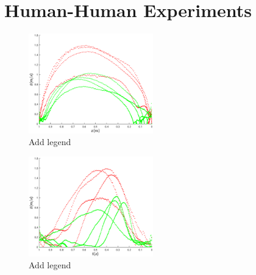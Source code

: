 \section{Human-Human Experiments}
\clearpage


    \begin{figure}[t]
      \centering
      \includegraphics[width = 0.48\textwidth]{Images/vel_distance_plot.eps}
      \caption{Add legend} 
      \label{fig:vel_distance}
	\end{figure}
	
	
    \begin{figure}[t]
      \centering
      \includegraphics[width = 0.48\textwidth]{Images/vel_time_plot.eps}
      \caption{Add legend} 
      \label{fig:vel_time}
	\end{figure}
	